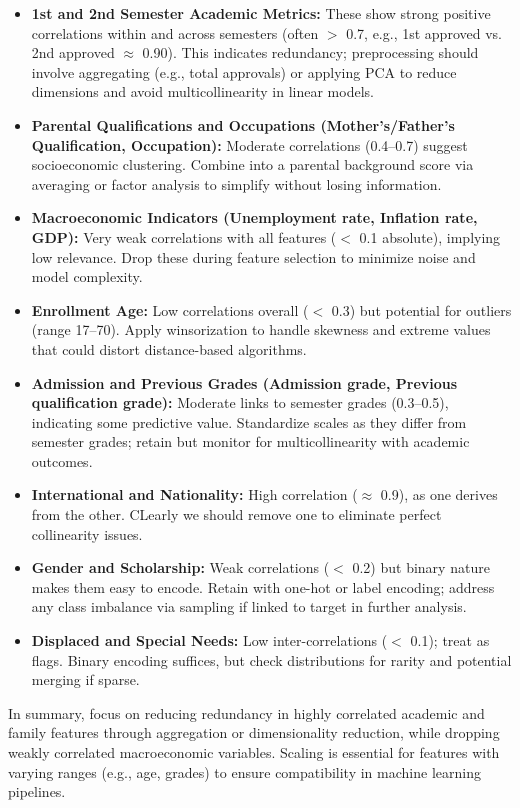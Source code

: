 \documentclass[twoside,final]{hcmut-report}
\begin{document}
\begin{itemize}
  \item \textbf{1st and 2nd Semester Academic Metrics:} These show strong positive correlations within and across semesters (often $>$ 0.7, e.g., 1st approved vs. 2nd approved $\approx$ 0.90). This indicates redundancy; preprocessing should involve aggregating (e.g., total approvals) or applying PCA to reduce dimensions and avoid multicollinearity in linear models.
  \item \textbf{Parental Qualifications and Occupations (Mother's/Father's Qualification, Occupation):} Moderate correlations (0.4--0.7) suggest socioeconomic clustering. Combine into a parental background score via averaging or factor analysis to simplify without losing information.
  \item \textbf{Macroeconomic Indicators (Unemployment rate, Inflation rate, GDP):} Very weak correlations with all features ($<$ 0.1 absolute), implying low relevance. Drop these during feature selection to minimize noise and model complexity.
  \item \textbf{Enrollment Age:} Low correlations overall ($<$ 0.3) but potential for outliers (range 17--70). Apply winsorization to handle skewness and extreme values that could distort distance-based algorithms.
  \item \textbf{Admission and Previous Grades (Admission grade, Previous qualification grade):} Moderate links to semester grades (0.3--0.5), indicating some predictive value. Standardize scales as they differ from semester grades; retain but monitor for multicollinearity with academic outcomes.
  \item \textbf{International and Nationality:} High correlation ($\approx$ 0.9), as one derives from the other. CLearly we should remove one to eliminate perfect collinearity issues.
  \item \textbf{Gender and Scholarship:} Weak correlations ($<$ 0.2) but binary nature makes them easy to encode. Retain with one-hot or label encoding; address any class imbalance via sampling if linked to target in further analysis.
  \item \textbf{Displaced and Special Needs:} Low inter-correlations ($<$ 0.1); treat as flags. Binary encoding suffices, but check distributions for rarity and potential merging if sparse.
\end{itemize}

In summary, focus on reducing redundancy in highly correlated academic and family features through aggregation or dimensionality reduction, while dropping weakly correlated macroeconomic variables. Scaling is essential for features with varying ranges (e.g., age, grades) to ensure compatibility in machine learning pipelines.
\end{document}
